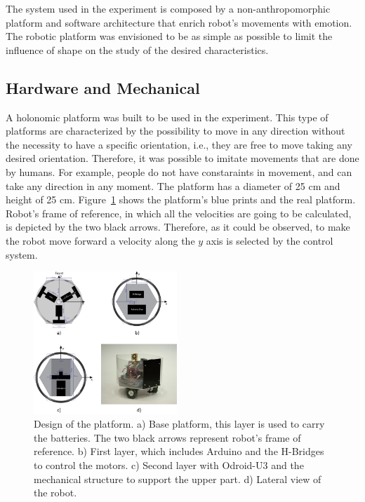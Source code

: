 
The system used in the experiment is composed by a non-anthropomorphic platform and software architecture that enrich robot's movements with emotion. The robotic platform was envisioned to be as simple as possible to limit the influence of shape on the study of the desired characteristics. 

\subsection{Hardware and Mechanical}

A holonomic platform was built to be used in the experiment. This type of platforms are characterized by the possibility to move in any direction without the necessity to have a specific orientation, i.e., they are free to move taking any desired orientation. Therefore, it was possible to imitate movements that are done by humans. For example, people do not have constaraints in movement, and can take any direction in any moment. The platform has a diameter of 25 cm and height of 25 cm. Figure~\ref{fig:ThirdDesign} shows the platform's blue prints and the real platform. Robot's frame of reference, in which all the velocities are going to be calculated, is depicted by the two black arrows. Therefore, as it could be observed, to make the robot move forward a velocity along the $y$ axis is selected by the control system.

\begin{figure}
	\centering
	\includegraphics[width=0.48\textwidth]{Images/DesignThird.png} 
	\caption{Design of the platform. a) Base platform, this layer is used to carry the batteries. The two black arrows represent robot's frame of reference. b) First layer, which includes Arduino and the H-Bridges to control the motors. c) Second layer with Odroid-U3 and the mechanical structure to support the upper part. d) Lateral view of the robot.}
	\label{fig:ThirdDesign}
\end{figure}

